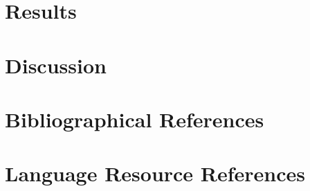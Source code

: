 \documentclass[10pt, a4paper]{article}
\begin{document}
\section{Results}

\section{Discussion}

\section{Bibliographical References}\label{reference}




\section{Language Resource References}
\label{lr:ref}
\end{document}
